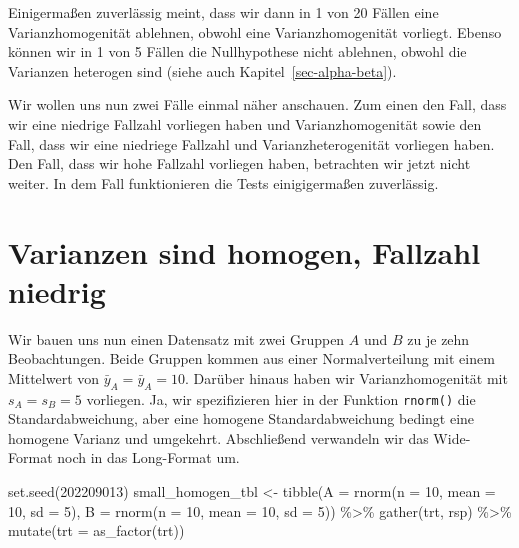 \documentclass[
  letterpaper,
]{scrbook}
\newenvironment{Shaded}{\begin{snugshade}}{\end{snugshade}}
\newcommand{\AttributeTok}[1]{\textcolor[rgb]{0.40,0.45,0.13}{#1}}
\newcommand{\DecValTok}[1]{\textcolor[rgb]{0.68,0.00,0.00}{#1}}
\newcommand{\FunctionTok}[1]{\textcolor[rgb]{0.28,0.35,0.67}{#1}}
\newcommand{\NormalTok}[1]{\textcolor[rgb]{0.00,0.23,0.31}{#1}}
\newcommand{\OtherTok}[1]{\textcolor[rgb]{0.00,0.23,0.31}{#1}}
\newcommand{\SpecialCharTok}[1]{\textcolor[rgb]{0.37,0.37,0.37}{#1}}
\begin{document}
Einigermaßen zuverlässig meint, dass wir dann in 1 von 20 Fällen eine
Varianzhomogenität ablehnen, obwohl eine Varianzhomogenität vorliegt.
Ebenso können wir in 1 von 5 Fällen die Nullhypothese nicht ablehnen,
obwohl die Varianzen heterogen sind (siehe auch
Kapitel~\ref{sec-alpha-beta}).

Wir wollen uns nun zwei Fälle einmal näher anschauen. Zum einen den
Fall, dass wir eine niedrige Fallzahl vorliegen haben und
Varianzhomogenität sowie den Fall, dass wir eine niedriege Fallzahl und
Varianzheterogenität vorliegen haben. Den Fall, dass wir hohe Fallzahl
vorliegen haben, betrachten wir jetzt nicht weiter. In dem Fall
funktionieren die Tests einigigermaßen zuverlässig.

\hypertarget{varianzen-sind-homogen-fallzahl-niedrig}{%
\section{Varianzen sind homogen, Fallzahl
niedrig}\label{varianzen-sind-homogen-fallzahl-niedrig}}

Wir bauen uns nun einen Datensatz mit zwei Gruppen \(A\) und \(B\) zu je
zehn Beobachtungen. Beide Gruppen kommen aus einer Normalverteilung mit
einem Mittelwert von \(\bar{y}_A = \bar{y}_A = 10\). Darüber hinaus
haben wir Varianzhomogenität mit \(s_A = s_B = 5\) vorliegen. Ja, wir
spezifizieren hier in der Funktion \texttt{rnorm()} die
Standardabweichung, aber eine homogene Standardabweichung bedingt eine
homogene Varianz und umgekehrt. Abschließend verwandeln wir das
Wide-Format noch in das Long-Format um.

\begin{Shaded}
\begin{Highlighting}[]
\FunctionTok{set.seed}\NormalTok{(}\DecValTok{202209013}\NormalTok{)}
\NormalTok{small\_homogen\_tbl }\OtherTok{\textless{}{-}} \FunctionTok{tibble}\NormalTok{(}\AttributeTok{A =} \FunctionTok{rnorm}\NormalTok{(}\AttributeTok{n =} \DecValTok{10}\NormalTok{, }\AttributeTok{mean =} \DecValTok{10}\NormalTok{, }\AttributeTok{sd =} \DecValTok{5}\NormalTok{),}
                            \AttributeTok{B =} \FunctionTok{rnorm}\NormalTok{(}\AttributeTok{n =} \DecValTok{10}\NormalTok{, }\AttributeTok{mean =} \DecValTok{10}\NormalTok{, }\AttributeTok{sd =} \DecValTok{5}\NormalTok{)) }\SpecialCharTok{\%\textgreater{}\%} 
  \FunctionTok{gather}\NormalTok{(trt, rsp) }\SpecialCharTok{\%\textgreater{}\%} 
  \FunctionTok{mutate}\NormalTok{(}\AttributeTok{trt =} \FunctionTok{as\_factor}\NormalTok{(trt))}
\end{Highlighting}
\end{Shaded}
\end{document}
